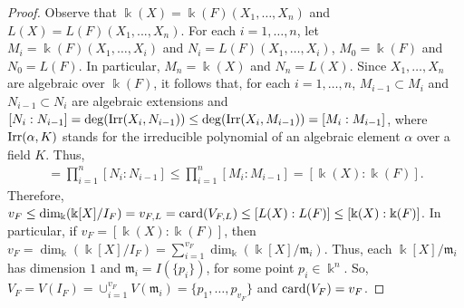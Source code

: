 \documentclass[11pt,reqno]{amsart}
\theoremstyle{definition}
\newcommand{\mbk}{\mbox{$\Bbbk$}}
\newcommand{\mfm}{\mbox{$\mathfrak{m}$}}
\newcommand{\mfn}{\mbox{$\mathfrak{n}$}}
\newcommand{\card}{\mbox{${\rm card}$}}
\newcommand{\irr}{\mbox{${\rm Irr}$}}
\newcommand{\Spec}{\mbox{${\rm Spec}$}}
\begin{document}
\begin{proof}
Observe that $\mbk(X)=\mbk(F)(X_1,\ldots,X_n)$ and 
$L(X)=L(F)(X_1,...,X_n)$. For each $i=1,\ldots,n$, let $M_i=\mbk(F)(X_1,\ldots,X_i)$ and $N_i=L(F)(X_1,\ldots,X_i)$, $M_0=\mbk(F)$ and $N_0=L(F)$. In particular, $M_n=\mbk(X)$ and $N_n=L(X)$. Since $X_1,\ldots,X_n$ are algebraic over $\mbk(F)$, it follows that, for each $i=1,\ldots,n$, $M_{i-1}\subset M_{i}$ and $N_{i-1}\subset N_{i}$ are algebraic extensions and $[N_{i}:N_{i-1}]=\deg(\irr(X_{i},N_{i-1}))\leq\deg(\irr(X_{i},M_{i-1}))=[M_i:M_{i-1}]$, where $\irr(\alpha,K)$ stands for the irreducible polynomial of an algebraic element $\alpha$ over a field $K$.
Thus,
\begin{eqnarray*}
[L(X):L(F)]=\prod_{i=1}^{n}[N_{i}:N_{i-1}]\leq \prod_{i=1}^{n}[M_{i}:M_{i-1}]=[\mbk(X):\mbk(F)].
\end{eqnarray*}
Therefore, 
$v_F\leq \dim_{\Bbbk}(\mbk[X]/I_F)=v_{F,L}=\card(V_{F,L})\leq [L(X):L(F)]\leq [\mbk(X):\mbk(F)]$.
In particular, if $v_F=[\mbk(X):\mbk(F)]$, then 
$v_F=\dim_{\Bbbk}(\mbk[X]/I_F)=\sum_{i=1}^{v_F}\dim_{\Bbbk}(\mbk[X]/\mfm_i)$. Thus, each
$\mbk[X]/\mfm_i$ has dimension $1$ and $\mfm_i=I(\{p_i\})$, for some point $p_i\in\mbk^n$. 
So, $V_F=V(I_F)=\cup_{i=1}^{v_F}V(\mfm_i)=\{p_1,\ldots,p_{v_{F}}\}$ and $\card(V_F)=v_F$.

\end{proof}
\end{document}
